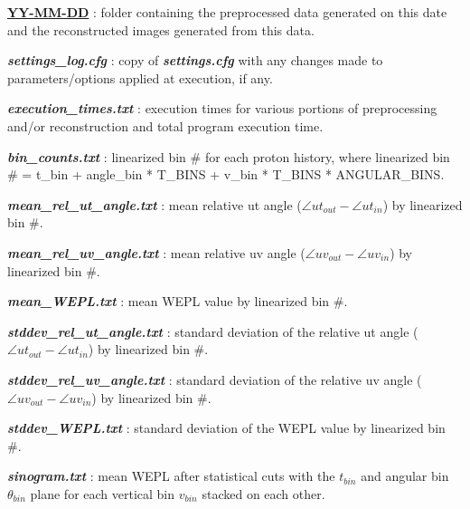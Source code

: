 \documentclass[landscape]{article}
\begin{document}
\begin{myEnumerate}[labelindent=0pt, leftmargin=*]
\begin{myEnumerate}[labelindent=1pt, leftmargin=*]
\begin{myEnumerate}[labelindent=1pt, leftmargin=*]
\begin{myEnumerate}[labelindent=1pt, leftmargin=*]
\begin{myEnumerate}[labelindent=1pt, leftmargin=*]
\begin{myEnumerate}[labelindent=1pt, leftmargin=*]
\begin{myEnumerate}[labelindent=1pt, leftmargin=*]
                            \begin{myEnumerate}[labelindent=1pt, leftmargin=*]
                                \item \ul{\textbf{YY-MM-DD}} : folder containing the preprocessed data generated on this date and the reconstructed images generated from this data.
                                \begin{myEnumerate}[labelindent=1pt, leftmargin=*]
                                    \item \textbf{\textit{settings\_log.cfg}} : copy of \textbf{\textit{settings.cfg}} with any changes made to parameters/options applied at execution, if any.
                                    \item \textbf{\textit{execution\_times.txt}} : execution times for various portions of preprocessing and/or reconstruction and total program execution time.
                                    \item \textbf{\textit{bin\_counts.txt}} : linearized bin \# for each proton history, where linearized bin \# = t\_bin + angle\_bin * T\_BINS + v\_bin * T\_BINS * ANGULAR\_BINS.
                                    \item \textbf{\textit{mean\_rel\_ut\_angle.txt}} : mean relative ut angle ($\angle ut_{out} -\angle ut_{in}$) by linearized bin \#.
                                    \item \textbf{\textit{mean\_rel\_uv\_angle.txt}} : mean relative uv angle ($\angle uv_{out} -\angle uv_{in}$) by linearized bin \#.
                                    \item \textbf{\textit{mean\_WEPL.txt}} : mean WEPL value by linearized bin \#.
                                    \item \textbf{\textit{stddev\_rel\_ut\_angle.txt}} : standard deviation of the relative ut angle ($\angle ut_{out} -\angle ut_{in}$) by linearized bin \#.
                                    \item \textbf{\textit{stddev\_rel\_uv\_angle.txt}} : standard deviation of the relative uv angle ($\angle uv_{out} -\angle uv_{in}$) by linearized bin \#.
                                    \item \textbf{\textit{stddev\_WEPL.txt}} : standard deviation of the WEPL value by linearized bin \#.
                                    \item \textbf{\textit{sinogram.txt}} : mean WEPL after statistical cuts with the $t_{bin}$ and angular bin $\theta_{bin}$ plane for each vertical bin $v_{bin}$ stacked on each other.

\end{myEnumerate}
\end{myEnumerate}
\end{myEnumerate}
\end{myEnumerate}
\end{myEnumerate}
\end{myEnumerate}
\end{myEnumerate}
\end{myEnumerate}
\end{myEnumerate}
\end{document}
